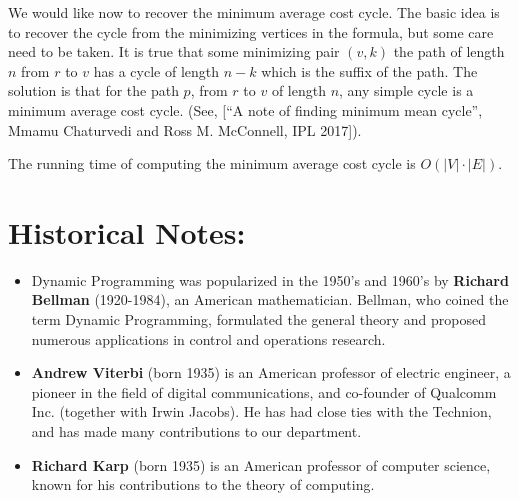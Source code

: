We would like now to recover the minimum average cost cycle. The
basic idea is to recover the cycle from the minimizing vertices in
the formula, but some care need to be taken. It is true that some
minimizing pair $(v,k)$ the path of length $n$ from $r$ to $v$ has a
cycle of length $n-k$ which is the suffix of the path. The solution
is that for the path $p$, from $r$ to $v$ of length $n$, any simple
cycle is a minimum average cost cycle. (See, [``A note of finding
minimum mean cycle'', Mmamu Chaturvedi and Ross M. McConnell, IPL
2017]).

The running time of computing the minimum average cost cycle is
$O(|V|\cdot |E|)$.

\section{Historical Notes:}
\begin{itemize}
  \item Dynamic Programming was popularized in the 1950's and 1960's by \textbf{Richard Bellman} (1920-1984), an American mathematician. Bellman, who coined the term Dynamic Programming, formulated the general theory and proposed numerous applications in control and operations research.
  \item \textbf{Andrew Viterbi} (born 1935) is an American professor of electric engineer, a pioneer in the field of digital communications, and co-founder of Qualcomm Inc. (together with Irwin Jacobs). He has had close ties with the Technion, and has made many contributions to our department.
  \item \textbf{Richard Karp} (born 1935) is an American professor
  of computer science, known for his contributions to the theory of
  computing.
\end{itemize}




%

